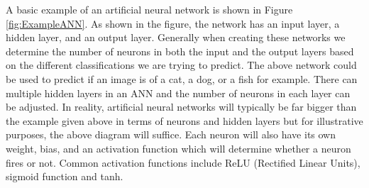 A basic example of an artificial neural network is shown in Figure \ref{fig:ExampleANN}. As shown in the figure, the network has an input layer, a hidden layer, and an output layer.  Generally when creating these networks we determine the number of neurons in both the input and the output layers based on the different classifications we are trying to predict.  The above network could be used to predict if an image is of a cat, a dog, or a fish for example.  There can multiple hidden layers in an ANN and the number of neurons in each layer can be adjusted.  In reality, artificial neural networks will typically be far bigger than the example given above in terms of neurons and hidden layers but for illustrative purposes, the above diagram will suffice.  Each neuron will also have its own weight, bias, and an activation function which will determine whether a neuron fires or not. Common activation functions include ReLU (Rectified Linear Units), sigmoid function and tanh.

